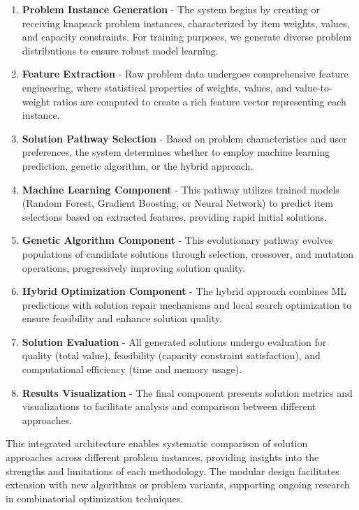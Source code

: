 \documentclass[conference, a4paper]{IEEEtran}
\begin{document}
\begin{enumerate}
    \item \textbf{Problem Instance Generation} - The system begins by creating or receiving knapsack problem instances, characterized by item weights, values, and capacity constraints. For training purposes, we generate diverse problem distributions to ensure robust model learning.
    
    \item \textbf{Feature Extraction} - Raw problem data undergoes comprehensive feature engineering, where statistical properties of weights, values, and value-to-weight ratios are computed to create a rich feature vector representing each instance.
    
    \item \textbf{Solution Pathway Selection} - Based on problem characteristics and user preferences, the system determines whether to employ machine learning prediction, genetic algorithm, or the hybrid approach.
    
    \item \textbf{Machine Learning Component} - This pathway utilizes trained models (Random Forest, Gradient Boosting, or Neural Network) to predict item selections based on extracted features, providing rapid initial solutions.
    
    \item \textbf{Genetic Algorithm Component} - This evolutionary pathway evolves populations of candidate solutions through selection, crossover, and mutation operations, progressively improving solution quality.
    
    \item \textbf{Hybrid Optimization Component} - The hybrid approach combines ML predictions with solution repair mechanisms and local search optimization to ensure feasibility and enhance solution quality.
    
    \item \textbf{Solution Evaluation} - All generated solutions undergo evaluation for quality (total value), feasibility (capacity constraint satisfaction), and computational efficiency (time and memory usage).
    
    \item \textbf{Results Visualization} - The final component presents solution metrics and visualizations to facilitate analysis and comparison between different approaches.
\end{enumerate}

This integrated architecture enables systematic comparison of solution approaches across different problem instances, providing insights into the strengths and limitations of each methodology. The modular design facilitates extension with new algorithms or problem variants, supporting ongoing research in combinatorial optimization techniques.
\end{document}
